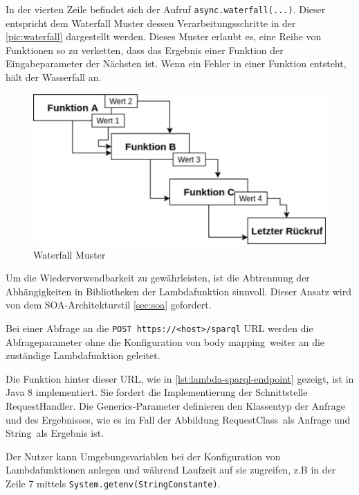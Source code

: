 \documentclass[
12pt,
english,
ngerman,
headsepline,
twoside,
openright,
numbers=noenddot,version=first
]{scrreprt}
\begin{document}
In der vierten Zeile befindet sich der Aufruf \lstinline|async.waterfall(...)|. Dieser entspricht dem Waterfall Muster dessen Verarbeitungsschritte in der \autoref{pic:waterfall} dargestellt werden. 
Dieses Muster erlaubt es, eine Reihe von Funktionen so zu verketten, dass das Ergebnis einer Funktion der Eingabeparameter der Nächsten ist. Wenn ein Fehler in einer Funktion entsteht, hält der Wasserfall an. 

\begin{figure}[H]
	\begin{center}
	\includegraphics[scale=0.6]{./pics/aws/pattern-waterfall.eps}
	\caption{Waterfall Muster}
	\label{pic:waterfall}
	\end{center}
\end{figure}

Um die Wiederverwendbarkeit zu gewährleisten, ist die Abtrennung der Abhängigkeiten in Bibliotheken der Lambdafunktion sinnvoll. Dieser Ansatz wird von dem \acrshort{SOA}-Architekturstil \autoref{sec:soa} gefordert.


Bei einer Abfrage an die \lstinline|POST https://<host>/sparql| \acrshort{URL} werden die Abfrageparameter ohne die Konfiguration von \glqq body mapping\grqq\ weiter an die zuständige Lambdafunktion geleitet.

Die Funktion hinter dieser \acrshort{URL}, wie in \autoref{lst:lambda-sparql-endpoint} gezeigt, ist in Java 8 implementiert. Sie fordert die Implementierung der Schnittstelle RequestHandler. Die Generics-Parameter definieren den Klassentyp der Anfrage und des Ergebnisses, wie es im Fall der Abbildung \glqq RequestClass\grqq\ als Anfrage und \glqq String\grqq\ als Ergebnis ist. 

Der Nutzer kann Umgebungsvariablen bei der Konfiguration von Lambdafunktionen anlegen und während Laufzeit auf sie zugreifen, z.B in der Zeile 7 mittels \lstinline|System.getenv(StringConstante)|.
\end{document}
